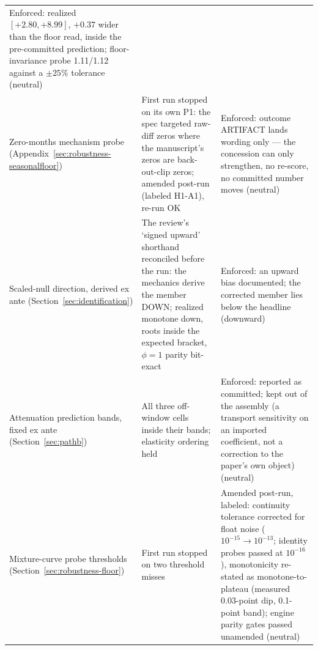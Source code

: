 \documentclass[12pt]{article}
\begin{document}
\begin{table}[H]
\begin{threeparttable}
\begin{tabular}{@{}p{4.4cm}p{4.2cm}p{5.6cm}@{}}
Enforced: realized $[+2.80, +8.99]$, $+0.37$ wider than the floor read, inside the pre-committed prediction; floor-invariance probe 1.11/1.12 against a $\pm 25\%$ tolerance (neutral) \\ Zero-months mechanism probe (Appendix~\ref{sec:robustness-seasonalfloor}) & First run stopped on its own P1: the spec targeted raw-diff zeros where the manuscript's zeros are back-out-clip zeros; amended post-run (labeled H1-A1), re-run OK & Enforced: outcome ARTIFACT lands wording only --- the concession can only strengthen, no re-score, no committed number moves (neutral) \\ Scaled-null direction, derived ex ante (Section~\ref{sec:identification}) & The review's `signed upward' shorthand reconciled before the run: the mechanics derive the member DOWN; realized monotone down, roots inside the expected bracket, $\phi = 1$ parity bit-exact & Enforced: an upward bias documented; the corrected member lies below the headline (downward) \\ Attenuation prediction bands, fixed ex ante (Section~\ref{sec:pathb}) & All three off-window cells inside their bands; elasticity ordering held & Enforced: reported as committed; kept out of the assembly (a transport sensitivity on an imported coefficient, not a correction to the paper's own object) (neutral) \\ Mixture-curve probe thresholds (Section~\ref{sec:robustness-floor}) & First run stopped on two threshold misses & Amended post-run, labeled: continuity tolerance corrected for float noise ($10^{-15} \to 10^{-13}$; identity probes passed at $10^{-16}$), monotonicity re-stated as monotone-to-plateau (measured 0.03-point dip, 0.1-point band); engine parity gates passed unamended (neutral) \\
\bottomrule
\end{tabular}
\end{threeparttable}
\end{table}
\end{document}

